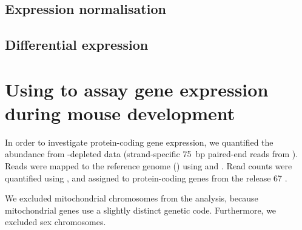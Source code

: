 \subsection{Expression normalisation}

\subsection{Differential expression}

\section{Using  to assay gene expression during mouse development}

In order to investigate protein-coding gene expression, we quantified the \mrna
abundance from \rrna-depleted \rnaseq data (strand-specific \SI{75}{bp}
paired-end reads from  ). Reads were mapped to
the \mmu reference genome () using 
\citep{Fonseca:2014} and  \citep{Kim:2013}. Read counts were
quantified using  \citep{Anders:2014}, and assigned to
protein-coding genes from the  release \num{67}
\citep{Flicek:2014}.

We excluded mitochondrial chromosomes from the analysis, because mitochondrial
genes use a slightly distinct genetic code. Furthermore, we excluded
sex chromosomes.
